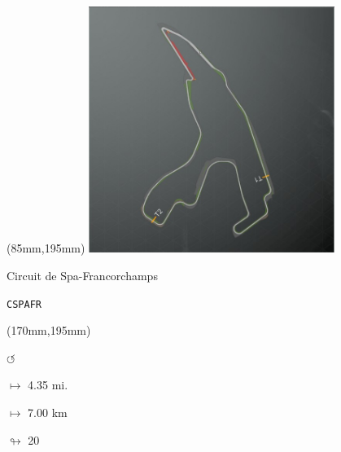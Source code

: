 \begin{textblock*}{80mm}(85mm,195mm)%
\includegraphics[width=80mm]{TR/2015-05-20_00021.png}
\centerline{Circuit de Spa-Francorchamps}
\par\hfill\tiny\tt CSPAFR\\
\end{textblock*}
\begin{textblock*}{30mm}(170mm,195mm)%
\par \Huge$\circlearrowleft$
\Large
\par$\mapsto$ 4.35 mi.
\par$\mapsto$ 7.00 km
\par$\looparrowright$ 20
\end{textblock*}
\null\newpage

